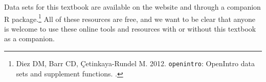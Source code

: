 


Data sets for this textbook are available on the website and through a companion R package.\footnote{Diez DM, Barr CD, \c{C}etinkaya-Rundel M. 2012. \texttt{openintro}: OpenIntro data sets and supplement functions. .} All of these resources are free, and we want to be clear that anyone is welcome to use these online tools and resources with or without this textbook as a companion.


